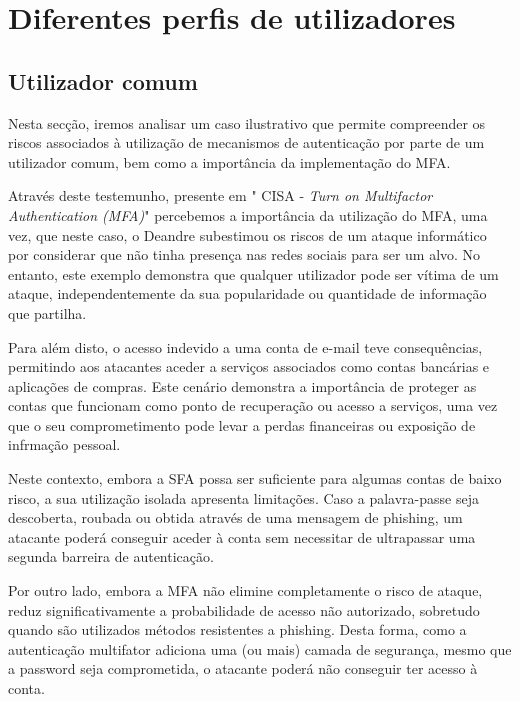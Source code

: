 \section{Diferentes perfis de utilizadores}

\subsection{Utilizador comum}

\hspace{1cm} Nesta secção, iremos analisar um caso ilustrativo que permite compreender os riscos associados à utilização de mecanismos de autenticação por parte de um utilizador comum, bem como a importância da implementação do MFA.

\hspace{1cm} Através deste testemunho, presente em " CISA - \textit{Turn on Multifactor Authentication (MFA)}" percebemos a importância da utilização do MFA, uma vez, que neste caso, o Deandre subestimou os riscos de um ataque informático por considerar que não tinha presença nas redes sociais para ser um alvo. No entanto, este exemplo demonstra que qualquer utilizador pode ser vítima de um ataque, independentemente da sua popularidade ou quantidade de informação que partilha.

\hspace{1cm} Para além disto, o acesso indevido a uma conta de e-mail teve consequências, permitindo aos atacantes aceder a serviços associados como contas bancárias e aplicações de compras. Este cenário demonstra a importância de proteger as contas que funcionam como ponto de recuperação ou acesso a serviços, uma vez que o seu comprometimento pode levar a perdas financeiras ou exposição de infrmação pessoal.

\hspace{1cm} Neste contexto, embora a SFA possa ser suficiente para algumas contas de baixo risco, a sua utilização isolada apresenta limitações. Caso a palavra-passe seja descoberta, roubada ou obtida através de uma mensagem de phishing, um atacante poderá conseguir aceder à conta sem necessitar de ultrapassar uma segunda barreira de autenticação.

\hspace{1cm} Por outro lado, embora a MFA não elimine completamente o risco de ataque, reduz significativamente a probabilidade de acesso não autorizado, sobretudo quando são utilizados métodos resistentes a phishing. Desta forma, como a autenticação multifator adiciona uma (ou mais) camada de segurança, mesmo que a password seja comprometida, o atacante poderá não conseguir ter acesso à conta.


